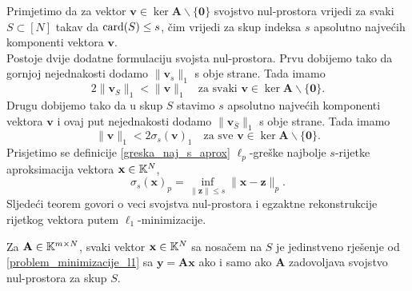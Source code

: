 \documentclass[a4paper,twoside,12pt]{memoir} %
\newcommand{\vect}[1]{\mathbf{#1}}
\renewcommand{\vec}{\vect}
\newcommand{\card}{\text{\normalfont{card}}}
\newcommand{\norm}[1]{\|{#1}\|}
\begin{document}
Primjetimo da za vektor $\vec v \in \ker \vec A \backslash \{ \vec 0\}$ svojstvo nul-prostora vrijedi za svaki $S \subset [N]$ takav da $\card(S) \leq s$, \v{c}im vrijedi za skup indeksa $s$ apsolutno najve\'cih komponenti vektora $\vec v$. \\
\indent Postoje dvije dodatne formulaciju svojsta nul-prostora. Prvu dobijemo tako da gornjoj nejednakosti dodamo $\norm{\vec v_s}_1$ s obje strane. Tada imamo
\begin{equation}\label{svojstvo_nul_prostora_form_1}
    2 \norm{\vec v_S}_1 < \norm{\vec v}_1 \quad \text{za svaki } \vec v \in \ker \vec A \backslash \{\vec 0\}.
\end{equation}
Drugu dobijemo tako da u skup $S$ stavimo $s$ apsolutno najve\'cih  komponenti vektora $\vec v$ i ovaj put nejednakosti dodamo $\norm{\vec v_{\bar S}}_1$ s obje strane. Tada imamo
\begin{equation}\label{svojstvo_nul_prostora_form_2}
    \norm{\vec v}_1 < 2 \sigma_s(\vec v)_1 \quad \text{za sve } \vec v \in \ker \vec A \backslash \{\vec 0\}.
\end{equation}
Prisjetimo se definicije \ref{greska_naj_s_aprox} $\ell_p$-gre\v{s}ke najbolje $s$-rijetke aproksimacija vektora $\vec x \in \K^N$,
\begin{equation*}
    \sigma_s(\vec x)_p = \inf_{\norm{\vec z} \leq s} \norm{\vec x - \vec z}_p.
\end{equation*}
Sljede\'ci teorem govori o veci svojstva nul-prostora i egzaktne rekonstrukcije rijetkog vektora putem $\ell_1$-minimizacije.
\begin{thm}\label{bp_tm1}
    Za $\vec A \in \K^{m \times N}$, svaki vektor $\vec x \in \K^N$ sa nosa\v{c}em na $S$ je jedinstveno rje\v{s}enje od \eqref{problem_minimizacije_l1} sa $\vec y = \vec {Ax}$ ako i samo ako $\vec A$ zadovoljava svojstvo nul-prostora za skup $S$.
\end{thm}
\end{document}
